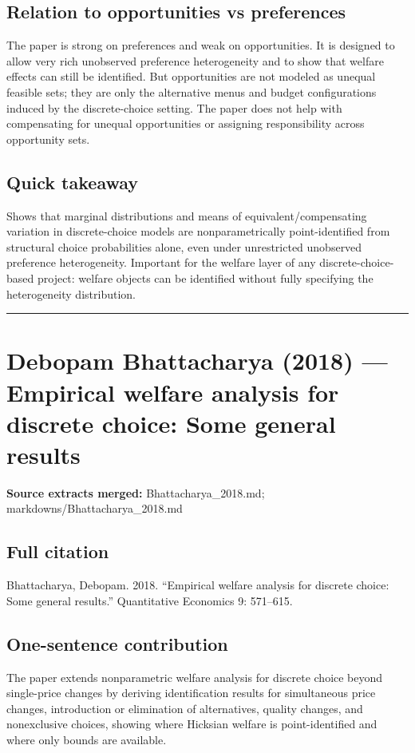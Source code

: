 \documentclass[11pt,a4paper]{article}
\begin{document}
\subsection*{Relation to opportunities vs preferences}
The paper is strong on preferences and weak on opportunities. It is designed to allow very rich unobserved preference heterogeneity and to show that welfare effects can still be identified. But opportunities are not modeled as unequal feasible sets; they are only the alternative menus and budget configurations induced by the discrete-choice setting. The paper does not help with compensating for unequal opportunities or assigning responsibility across opportunity sets.

\subsection*{Quick takeaway}
Shows that marginal distributions and means of equivalent/compensating variation in discrete-choice models are nonparametrically point-identified from structural choice probabilities alone, even under unrestricted unobserved preference heterogeneity. Important for the welfare layer of any discrete-choice-based project: welfare objects can be identified without fully specifying the heterogeneity distribution.


\medskip\hrule\medskip

\section*{Debopam Bhattacharya (2018) — Empirical welfare analysis for discrete choice: Some general results}

\textbf{Source extracts merged:} Bhattacharya\_2018.md; markdowns/Bhattacharya\_2018.md

\subsection*{Full citation}
Bhattacharya, Debopam. 2018. “Empirical welfare analysis for discrete choice: Some general results.” Quantitative Economics 9: 571–615.

\subsection*{One-sentence contribution}
The paper extends nonparametric welfare analysis for discrete choice beyond single-price changes by deriving identification results for simultaneous price changes, introduction or elimination of alternatives, quality changes, and nonexclusive choices, showing where Hicksian welfare is point-identified and where only bounds are available.
\end{document}
